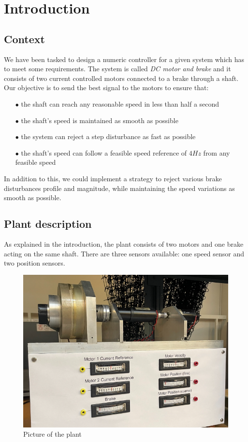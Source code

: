 \setcounter{secnumdepth}{-1}

\chapter{Introduction}

\section{Context}
\label{section:intro}

We have been tasked to design a numeric controller for a given system which has to meet some requirements. The system is 
called \textit{DC motor and brake} and it consists of two current controlled motors connected to a brake through a shaft. \\

Our objective is to send the best signal to the motors to ensure that:

\begin{enumerate}
    \item[$\bullet$] the shaft can reach any reasonable speed in less than half a second
    \item[$\bullet$] the shaft's speed is maintained as smooth as possible
    \item[$\bullet$] the system can reject a step disturbance as fast as possible
    \item[$\bullet$] the shaft's speed can follow a feasible speed reference of $4 Hz$ from any feasible speed
\end{enumerate}

In addition to this, we could implement a strategy to reject various brake disturbances profile and magnitude, while 
maintaining the speed variations as smooth as possible.

\section{Plant description}

As explained in the introduction, the plant consists of two motors and one brake acting on the same shaft. There are 
three sensors available: one speed sensor and two position sensors.

\begin{figure}[H]
    \centering
    \includegraphics[width=\textwidth]{Pictures/plant_picture.png}
    \caption{Picture of the plant}
\end{figure}

